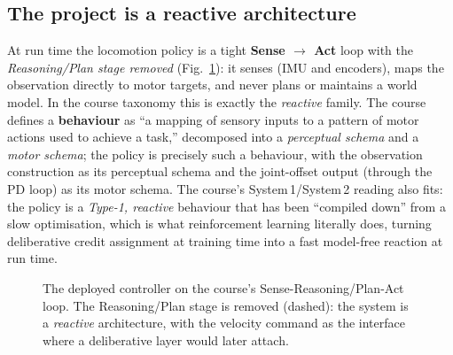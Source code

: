 \documentclass[conference]{IEEEtran}
\begin{document}
\subsection{The project is a reactive architecture}
At run time the locomotion policy is a tight \textbf{Sense $\rightarrow$ Act} loop with the
\emph{Reasoning/Plan stage removed} (Fig.~\ref{fig:loop}): it senses (IMU and encoders), maps the
observation directly to motor targets, and never plans or maintains a world model. In the course
taxonomy this is exactly the \emph{reactive} family. The course defines a \textbf{behaviour} as
``a mapping of sensory inputs to a pattern of motor actions used to achieve a task,'' decomposed
into a \emph{perceptual schema} and a \emph{motor schema}; the policy is precisely such a
behaviour, with the observation construction as its perceptual schema and the joint-offset output
(through the PD loop) as its motor schema. The course's System\,1/System\,2 reading also fits:
the policy is a \emph{Type-1, reactive} behaviour that has been ``compiled down'' from a slow
optimisation, which is what reinforcement learning literally does, turning deliberative credit
assignment at training time into a fast model-free reaction at run time.

\begin{figure}[t]
\centering
{}
\caption{The deployed controller on the course's Sense-Reasoning/Plan-Act loop. The
Reasoning/Plan stage is removed (dashed): the system is a \emph{reactive} architecture, with the
velocity command as the interface where a deliberative layer would later attach.}
\label{fig:loop}
\end{figure}
\end{document}
